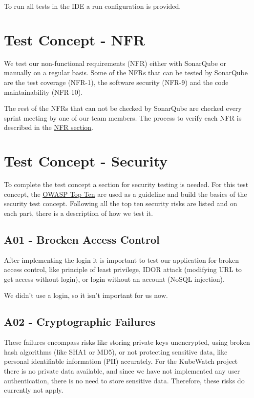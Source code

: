 To run all tests in the IDE a run configuration is provided.


\section{Test Concept - NFR}
We test our non-functional requirements (NFR) either with SonarQube or manually on a regular basis. Some of the NFRs that can be tested by SonarQube are the test coverage (NFR-1), the software security (NFR-9) and the code maintainability (NFR-10).

The rest of the NFRs that can not be checked by SonarQube are checked every sprint meeting by one of our team members.
The process to verify each NFR is described in the \hyperref[non-functional-requirements]{NFR section}.

\section{Test Concept - Security}
To complete the test concept a section for security testing is needed. For this test concept, the \href{https://owasp.org/www-project-top-ten/}{OWASP Top Ten} are used as a guideline and build the basics of the security test concept.
Following all the top ten security risks are listed and on each part, there is a description of how we test it.

\subsection{A01 - Brocken Access Control}
After implementing the login it is important to test our application for broken access control, like principle of least privilege, IDOR attack (modifying URL to get access without login), or login without an account (NoSQL injection).

We didn't use a login, so it isn't important for us now.

\subsection{A02 - Cryptographic Failures}
These failures encompass risks like storing private keys unencrypted, using broken hash algorithms (like SHA1 or MD5), or not protecting sensitive data, like personal identifiable information (PII) accurately. For the KubeWatch project there is no private data available, and since we have not implemented any user authentication, there is no need to store sensitive data. Therefore, these risks do currently not apply.

